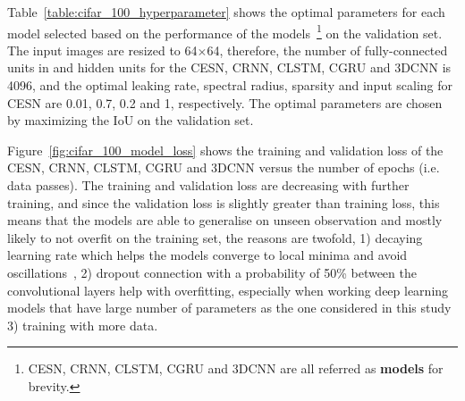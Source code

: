 \documentclass{WitsPhysicsReport}
\begin{document}
 Table~\ref{table:cifar_100_hyperparameter} shows the optimal parameters for each model selected based on the performance of the models~\footnote{CESN, CRNN, CLSTM, CGRU and 3DCNN are all referred as \textbf{models} for brevity.} on the validation set. The input images are resized to 64$\times$64, therefore, the number of fully-connected units in and hidden units for the CESN, CRNN, CLSTM, CGRU and 3DCNN is 4096, and the optimal leaking rate, spectral radius, sparsity and input scaling for CESN are 0.01, 0.7, 0.2 and 1, respectively. The optimal parameters are chosen by maximizing the IoU on the validation set.
\begin{table}[H]
    \centering
        \caption{CIFAR-100 dataset optimal parameters for the CESN, CRNN, CLSTM, CGRU and 3DCNN}
    \label{table:cifar_100_hyperparameter}
\end{table}

Figure~\ref{fig:cifar_100_model_loss} shows the training and validation loss of the CESN, CRNN, CLSTM, CGRU and 3DCNN versus the number of epochs (i.e. data passes). The training and validation loss are decreasing with further training, and since the validation loss is slightly greater than training loss, this means that the models are able to generalise on unseen observation and mostly likely to not overfit on the training set, the reasons are twofold, 1) decaying learning rate which helps the models converge to local minima and avoid oscillations~\cite{you2019does}, 2) dropout connection with a probability of 50\% between the convolutional layers help with overfitting, especially when working deep learning models that have large number of parameters as the one considered in this study~\cite{hinton2012improving} 3) training with more data.
\end{document}
